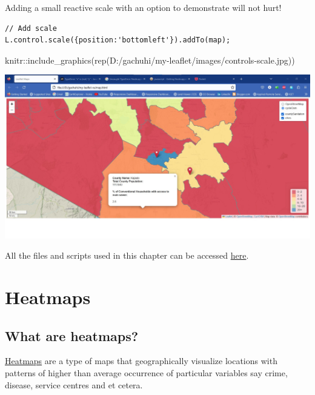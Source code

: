 \documentclass[
]{book}
\newenvironment{Shaded}{\begin{snugshade}}{\end{snugshade}}
\newcommand{\FunctionTok}[1]{\textcolor[rgb]{0.00,0.00,0.00}{#1}}
\newcommand{\NormalTok}[1]{#1}
\newcommand{\SpecialCharTok}[1]{\textcolor[rgb]{0.00,0.00,0.00}{#1}}
\newcommand{\StringTok}[1]{\textcolor[rgb]{0.31,0.60,0.02}{#1}}
\begin{document}
Adding a small reactive scale with an option to demonstrate will not hurt!

\begin{verbatim}
// Add scale
L.control.scale({position:'bottomleft'}).addTo(map);
\end{verbatim}

\begin{Shaded}
\begin{Highlighting}[]
\NormalTok{knitr}\SpecialCharTok{::}\FunctionTok{include\_graphics}\NormalTok{(}\FunctionTok{rep}\NormalTok{(}\StringTok{\textquotesingle{}D:/gachuhi/my{-}leaflet/images/controls{-}scale.jpg\textquotesingle{}}\NormalTok{))}
\end{Highlighting}
\end{Shaded}

\includegraphics[width=26.67in]{../images/controls-scale}

All the files and scripts used in this chapter can be accessed \href{https://www.dropbox.com/scl/fo/0njhl757vantwggnsidks/h?dl=0\&rlkey=18m27j58agq6209lkppkdtgqo}{here}.

\hypertarget{heatmaps}{%
\chapter{Heatmaps}\label{heatmaps}}

\hypertarget{what-are-heatmaps}{%
\section{What are heatmaps?}\label{what-are-heatmaps}}

\href{https://www.gislounge.com/heat-maps-in-gis/}{Heatmaps} are a type of maps that geographically visualize locations with patterns of higher than average occurrence of particular variables say crime, disease, service centres and et cetera.
\end{document}
